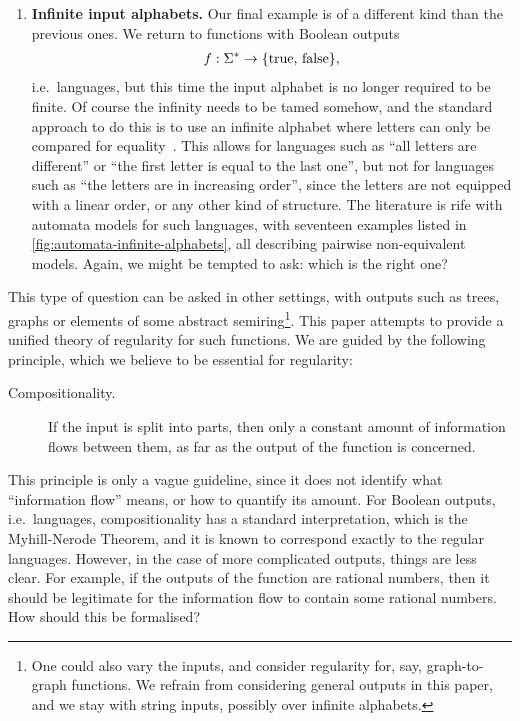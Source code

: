 \begin{enumerate}
\item \textbf{Infinite input alphabets.}
Our final example is of a different kind than the previous ones. We return to functions with Boolean outputs
\begin{align*}
f : \Sigma^* \to \{\text{true, false}\},
\end{align*}
i.e.~languages, but this time the input alphabet is no longer required to be finite. Of course the infinity needs to be tamed somehow, and the standard approach to do this is to use an infinite alphabet where letters can only be compared for equality~\cite{kaminskiFiniteMemoryAutomata1994}. This allows for languages such as ``all letters are different'' or ``the first letter is equal to the last one'', but not for languages such as ``the letters are in increasing order'', since the letters are not equipped with a linear order, or any other kind of structure.
The literature is rife with automata models for such languages, with seventeen examples listed in \cref{fig:automata-infinite-alphabets}, all describing pairwise non-equivalent models. 
 Again, we might be tempted to ask: which  is  the right one?
\end{enumerate}

This type of question can be asked in other settings, with   outputs such as  trees,  graphs or elements of some abstract semiring\footnote{One could also vary the inputs, and consider regularity for, say, graph-to-graph functions. We refrain from considering general outputs in this paper, and we stay with string inputs, possibly over infinite alphabets.}. This paper attempts to provide a unified theory of regularity for such functions.   We are guided by  the following principle, which we believe to be essential for regularity:
\begin{description}
    \item[Compositionality.]  If the input is split into parts, then only a constant amount of information  flows between them, as far as the output of the function is concerned.
\end{description}
This principle is only a vague guideline, since it does not identify what
``information flow'' means, or how to quantify its amount. For Boolean outputs,
i.e.~languages, compositionality has a standard interpretation, which is the
Myhill-Nerode Theorem, and it is known to
correspond exactly to the regular languages. However, in the case of more
complicated outputs, things are less clear.  For example, if the outputs of the
function are rational numbers, then it should be legitimate for the information
flow to contain some rational numbers. How should this be formalised?

